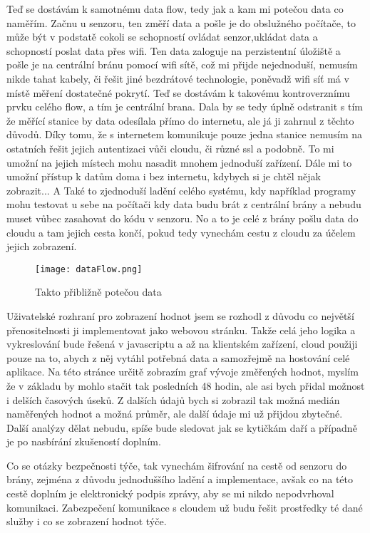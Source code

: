 Teď se dostávám k samotnému data flow, tedy jak a kam mi potečou data co naměřím. Začnu u senzoru, ten změří data 
a pošle je do obslužného počítače, to může být v podstatě cokoli se schopností ovládat senzor,ukládat data a schopností 
poslat data přes wifi. Ten data zaloguje na perzistentní úložiště a pošle je na centrální bránu pomocí wifi sítě, což mi 
přijde nejednoduší, nemusím nikde tahat kabely, či řešit jiné bezdrátové technologie, poněvadž wifi síť má v místě 
měření dostatečné pokrytí. Teď se dostávám k takovému kontroverznímu prvku celého flow, a tím je centrální \gls{brana}. 
Dala by se tedy úplně odstranit s tím že měřící stanice by data odesílala přímo do internetu, ale já ji zahrnul z těchto 
důvodů. Díky tomu, že s internetem komunikuje pouze jedna stanice nemusím na ostatních řešit jejich autentizaci vůči 
cloudu, či různé \gls{ssl}  a podobně. To mi umožní na jejich místech mohu nasadit 
mnohem jednoduší zařízení. Dále mi to umožní přístup k datům doma i bez internetu, kdybych si je chtěl nějak zobrazit... 
A Také to zjednoduší ladění celého systému, kdy například programy mohu testovat u sebe na počítači kdy data budu brát 
z centrální brány a nebudu muset vůbec zasahovat do kódu v senzoru. No a to je celé z brány pošlu data do cloudu a tam 
jejich cesta končí, pokud tedy vynechám cestu z cloudu za účelem jejich zobrazení.
\begin{figure}[H]
		\centering
		\texttt{[image: dataFlow.png]}
		\caption{Takto přibližně potečou data}
\end{figure}

Uživatelské rozhraní pro zobrazení hodnot jsem se rozhodl z důvodu co největší přenositelnosti ji implementovat jako 
webovou stránku. Takže celá jeho logika a vykreslování bude řešená v javascriptu a až na klientském zařízení, cloud 
použiji pouze na to, abych z něj vytáhl potřebná data a samozřejmě na hostování celé aplikace. Na této stránce určitě 
zobrazím graf vývoje změřených hodnot, myslím že v základu by mohlo stačit tak posledních 48 hodin, ale asi bych přidal 
možnost i delších časových úseků. Z dalších údajů bych si zobrazil tak možná medián naměřených hodnot a možná průměr, 
ale další údaje mi už přijdou zbytečné. Další analýzy dělat nebudu, spíše  bude sledovat jak se kytičkám daří a případně 
je po nasbírání zkušeností doplním.

Co se otázky bezpečnosti týče, tak vynechám šifrování na cestě od senzoru do brány, zejména z důvodu jednoduššího ladění 
a implementace, avšak co na této cestě doplním je elektronický podpis zprávy, aby se mi nikdo nepodvrhoval komunikaci. 
Zabezpečení komunikace s cloudem už budu řešit prostředky té dané služby i co se zobrazení hodnot týče.
